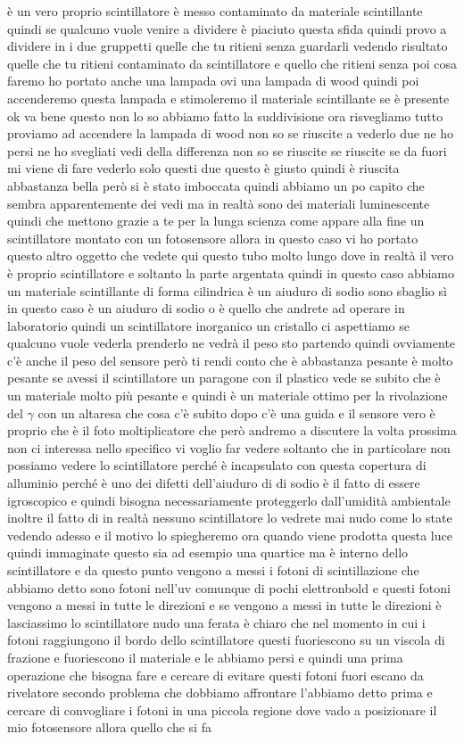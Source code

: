 è un vero proprio scintillatore è messo contaminato da materiale scintillante quindi se qualcuno vuole venire a dividere è piaciuto questa sfida quindi provo a dividere in i due gruppetti quelle che tu ritieni senza guardarli vedendo risultato quelle che tu ritieni contaminato da scintillatore e quello che ritieni senza poi cosa faremo ho portato anche una lampada ovi una lampada di wood quindi poi accenderemo questa lampada e stimoleremo il materiale scintillante se è presente ok va bene questo non lo so abbiamo fatto la suddivisione ora risvegliamo tutto proviamo ad accendere la lampada di wood non so se riuscite a vederlo due ne ho persi ne ho svegliati vedi della differenza non so se riuscite se riuscite se da fuori mi viene di fare vederlo solo questi due questo è giusto quindi è riuscita abbastanza bella però si è stato imboccata quindi abbiamo un po capito che sembra apparentemente dei vedi ma in realtà sono dei materiali luminescente quindi che mettono grazie a te per la lunga scienza come appare alla fine un scintillatore montato con un fotosensore allora in questo caso vi ho portato questo altro oggetto che vedete qui questo tubo molto lungo dove in realtà il vero è proprio scintillatore e soltanto la parte argentata quindi in questo caso abbiamo un materiale scintillante di forma cilindrica è un aiuduro di sodio sono sbaglio sì in questo caso è un aiuduro di sodio o è quello che andrete ad operare in laboratorio quindi un scintillatore inorganico un cristallo ci aspettiamo se qualcuno vuole vederla prenderlo ne vedrà il peso sto partendo quindi ovviamente c'è anche il peso del sensore però ti rendi conto che è abbastanza pesante è molto pesante se avessi il scintillatore un paragone con il plastico vede se subito che è un materiale molto più pesante e quindi è un materiale ottimo per la rivolazione del $\gamma$ con un altaresa che cosa c'è subito dopo c'è una guida e il sensore vero è proprio che è il foto moltiplicatore che però andremo a discutere la volta prossima non ci interessa nello specifico vi voglio far vedere soltanto che in particolare non possiamo vedere lo scintillatore perché è incapsulato con questa copertura di alluminio perché è uno dei difetti dell'aiuduro di di sodio è il fatto di essere igroscopico e quindi bisogna necessariamente proteggerlo dall'umidità ambientale inoltre il fatto di in realtà nessuno scintillatore lo vedrete mai nudo come lo state vedendo adesso e il motivo lo spiegheremo ora quando viene prodotta questa luce quindi immaginate questo sia ad esempio una quartice ma è interno dello scintillatore e da questo punto vengono a messi i fotoni di scintillazione che abbiamo detto sono fotoni nell'uv comunque di pochi elettronbold e questi fotoni vengono a messi in tutte le direzioni e se vengono a messi in tutte le direzioni è lasciassimo lo scintillatore nudo una ferata è chiaro che nel momento in cui i fotoni raggiungono il bordo dello scintillatore questi fuoriescono su un viscola di frazione e fuoriescono il materiale e le abbiamo persi e quindi una prima operazione che bisogna fare e cercare di evitare questi fotoni fuori escano da rivelatore secondo problema che dobbiamo affrontare l'abbiamo detto prima e cercare di convogliare i fotoni in una piccola regione dove vado a posizionare il mio fotosensore allora quello che si fa 